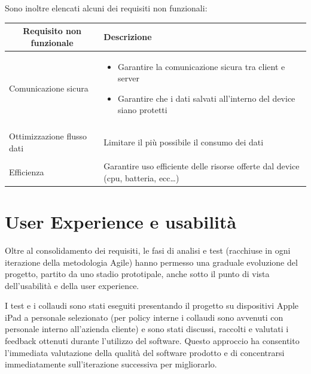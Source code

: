 Sono inoltre elencati alcuni dei requisiti non funzionali:

\begin{center}
    

    \begin{tabular}{p{6cm}|p{8cm}}

    \toprule
    \multicolumn{1}{c}{\textbf{Requisito non funzionale}} &
    \textbf{Descrizione}\\

    \midrule
    Comunicazione sicura & \begin{itemize}
                            \item Garantire la comunicazione sicura tra client e server
                            \item Garantire che i dati salvati all'interno del device siano protetti
                           \end{itemize}\\\\
    Ottimizzazione flusso dati & Limitare il più possibile il consumo dei dati\\\\
    Efficienza & Garantire uso efficiente delle risorse offerte dal device (cpu, batteria, ecc\dots)\\

    \bottomrule

    \end{tabular}

\end{center}

\section{User Experience e usabilità}

Oltre al consolidamento dei requisiti, le fasi di analisi e test (racchiuse in ogni iterazione della metodologia Agile) hanno permesso una graduale evoluzione del progetto, partito da uno stadio prototipale, anche sotto il punto di vista dell'usabilità e della user experience.

I test e i collaudi sono stati eseguiti presentando il progetto su dispositivi Apple iPad a personale selezionato (per policy interne i collaudi sono avvenuti con personale interno all'azienda cliente) e sono stati discussi, raccolti e valutati i feedback ottenuti durante l'utilizzo del software.
Questo approccio ha consentito l'immediata valutazione della qualità del software prodotto e di concentrarsi immediatamente sull'iterazione successiva per migliorarlo.

